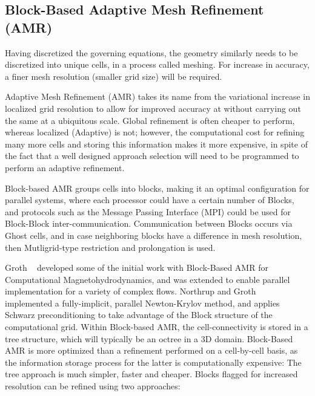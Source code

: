 \subsection{Block-Based Adaptive Mesh Refinement (AMR)}
Having discretized the governing equations, the geometry similarly needs to be discretized into unique cells, in a process called meshing. For increase in accuracy, a finer mesh resolution (smaller grid size) will be required. \par

Adaptive Mesh Refinement (AMR) takes its name from the variational increase in localized grid resolution to allow for improved accuracy at without carrying out the same at a ubiquitous scale. Global refinement is often cheaper to perform, whereas localized (Adaptive) is not; however, the computational cost for refining many more cells and storing this information makes it more expensive, in spite of the fact that a well designed approach selection will need to be programmed to perform an adaptive refinement.\par
Block-based AMR groups cells into blocks, making it an optimal configuration for parallel systems, where each processor could have a certain number of Blocks, and protocols such as the Message Passing Interface (MPI) could be used for Block-Block inter-communication. Communication between Blocks occurs via Ghost cells, and in case neighboring blocks have a difference in mesh resolution, then Mutligrid-type restriction and prolongation is used.\par

Groth \etal ~\cite{Groth:1999} developed some of the initial work with Block-Based AMR for Computational Magnetohydrodynamics, and was extended to enable parallel implementation for a variety of complex flows. Northrup and Groth ~\cite{Northrup:2005b} implemented a fully-implicit, parallel Newton-Krylov method, and applies Schwarz preconditioning to take advantage of the Block structure of the computational grid.
Within Block-based AMR, the cell-connectivity is stored in a tree structure, which will typically be an octree in a 3D domain. Block-Based AMR is more optimized than a refinement performed on a cell-by-cell basis, as the information storage process for the latter is computationally expensive: The tree approach is much simpler, faster and cheaper. Blocks flagged for increased  resolution can be refined using two approaches: \par



